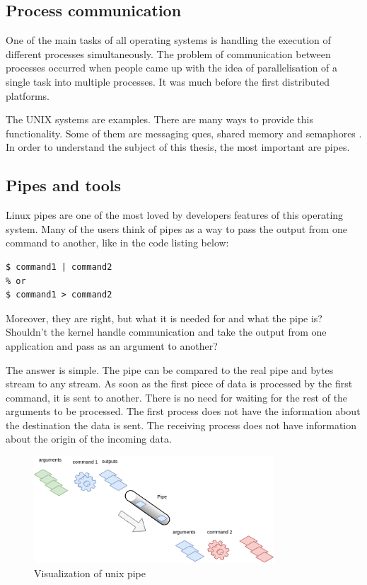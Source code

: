 \subsection{Process communication}
\label{subsec:processCommunication}
One of the main tasks of all operating systems is handling the execution of different processes simultaneously. The problem of communication between processes occurred when people came up with the idea of parallelisation of a single task into multiple processes. It was much before the first distributed platforms. 

The UNIX systems are examples. There are many ways to provide this functionality. Some of them are messaging ques, shared memory and semaphores \cite{linuxDocs}. In order to understand the subject of this thesis, the most important are pipes. 


\subsection{Pipes and tools}
\label{subsec:pipesAndTools}
Linux pipes are one of the most loved by developers features of this operating system. Many of the users think of pipes as a way to pass the output from one command to another, like in the code listing below:
\begin{verbatim}
$ command1 | command2
% or
$ command1 > command2
\end{verbatim}
Moreover, they are right, but what it is needed for and what the pipe is? Shouldn't the kernel handle communication and take the output from one application and pass as an argument to another? 

The answer is simple. The pipe can be compared to the real pipe and bytes stream to any stream. As soon as the first piece of data is processed by the first command, it is sent to another. There is no need for waiting for the rest of the arguments to be processed. The first process does not have the information about the destination the data is sent. The receiving process does not have information about the origin of the incoming data. 

\begin{figure}[h!]
 \centering
  \includegraphics[width=0.8\textwidth]{pictures/stream.png}
  \caption{Visualization of unix pipe }
  \label{fig:stream}
\end{figure}


